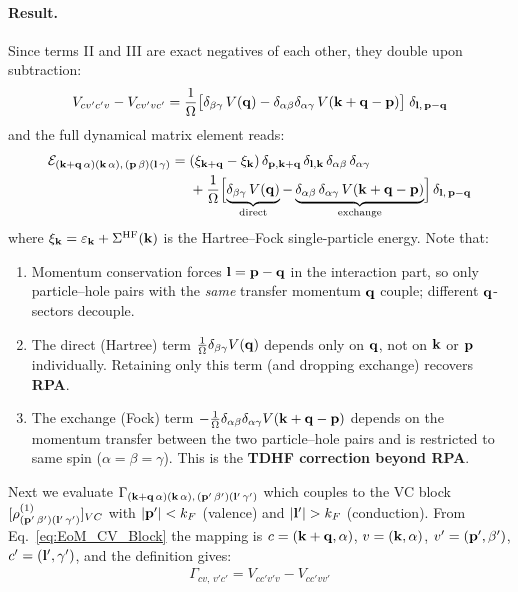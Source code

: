 \documentclass[11pt,letterpaper]{article}
\theoremstyle{definition}
\theoremstyle{plain}
\theoremstyle{remark}
\newcommand{\eps}{\varepsilon}
\begin{document}
\paragraph{Result.} Since terms II and III are exact negatives of each other, they double upon subtraction:
\begin{gather}
    V_{cv'c'v} - V_{cv'vc'} = \frac{1}{\Omega}\bigl[\delta_{\beta\gamma}\,V(\vb{q}) - \delta_{\alpha\beta}\delta_{\alpha\gamma}\,V(\vb{k}+\vb{q}-\vb{p})\bigr]\;\delta_{\vb{l},\,\vb{p}-\vb{q}}
\end{gather}
and the full dynamical matrix element reads:
\begin{align}
    \mathcal{E}_{(\vb{k}+\vb{q}\, \alpha)(\vb{k}\, \alpha),\, (\vb{p}\, \beta)(\vb{l}\, \gamma)} =\;& (\xi_{\vb{k}+\vb{q}} - \xi_{\vb{k}})\,\delta_{\vb{p},\vb{k}+\vb{q}}\,\delta_{\vb{l},\vb{k}}\,\delta_{\alpha\beta}\,\delta_{\alpha\gamma} \nonumber \\
    &+ \frac{1}{\Omega}\Bigl[\underbrace{\delta_{\beta\gamma}\,V(\vb{q})}_{\text{direct}} - \underbrace{\delta_{\alpha\beta}\,\delta_{\alpha\gamma}\,V(\vb{k}+\vb{q}-\vb{p})}_{\text{exchange}}\Bigr]\,\delta_{\vb{l},\,\vb{p}-\vb{q}} \label{eq:E_HEG}
\end{align}
where $\xi_{\vb{k}} = \eps_{\vb{k}} + \Sigma^{\mathrm{HF}}(\vb{k})$ is the Hartree--Fock single-particle energy. Note that:
\begin{enumerate}
    \item Momentum conservation forces $\vb{l} = \vb{p} - \vb{q}$ in the interaction part, so only particle--hole pairs with the \emph{same} transfer momentum $\vb{q}$ couple; different $\vb{q}$-sectors decouple.
    \item The direct (Hartree) term $\frac{1}{\Omega}\delta_{\beta\gamma} V(\vb{q})$ depends only on $\vb{q}$, not on $\vb{k}$ or $\vb{p}$ individually. Retaining only this term (and dropping exchange) recovers \textbf{RPA}.
    \item The exchange (Fock) term $-\frac{1}{\Omega}\delta_{\alpha\beta}\delta_{\alpha\gamma} V(\vb{k}+\vb{q}-\vb{p})$ depends on the momentum transfer between the two particle--hole pairs and is restricted to same spin ($\alpha = \beta = \gamma$). This is the \textbf{TDHF correction beyond RPA}.
\end{enumerate}

Next we evaluate $\Gamma_{(\vb{k}+\vb{q}\,\alpha)(\vb{k}\,\alpha),\,(\vb{p}'\,\beta')(\vb{l}'\,\gamma')}$ which couples to the VC block $[\rho^{(1)}_{(\vb{p}'\,\beta')(\vb{l}'\,\gamma')}]_{VC}$ with $\abs{\vb{p}'} < k_F$ (valence) and $\abs{\vb{l}'} > k_F$ (conduction). From Eq.~\eqref{eq:EoM_CV_Block} the mapping is $c = (\vb{k}+\vb{q},\alpha)$, $v = (\vb{k},\alpha)$, $v' = (\vb{p}',\beta')$, $c' = (\vb{l}',\gamma')$, and the definition gives:
\begin{gather}
    \Gamma_{cv,\,v'c'} = V_{cc'v'v} - V_{cc'vv'}
\end{gather}
\end{document}
